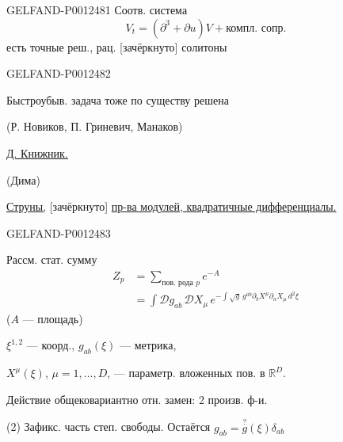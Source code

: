 \begin{GelfandAdjacentEvidence}{GELFAND-P001248}{1}
Соотв. система
\begin{equation*}
V_t=(\partial^3+\partial u)V+\text{компл. сопр.}\tag{23}
\end{equation*}
есть точные реш., рац. [зачёркнуто] солитоны
\end{GelfandAdjacentEvidence}
\begin{GelfandAdjacentEvidence}{GELFAND-P001248}{2}


Быстроубыв. задача тоже по существу решена

(Р. Новиков, П. Гриневич, Манаков)

\underline{\underline{Д. Книжник.}}

(Дима)

\underline{Струны,} [зачёркнуто] \underline{пр-ва модулей, квадратичные дифференциалы.}
\end{GelfandAdjacentEvidence}
\begin{GelfandAdjacentEvidence}{GELFAND-P001248}{3}


Рассм. стат. сумму
\begin{equation*}
\begin{aligned}
Z_p&=\sum_{\text{пов. рода }p}e^{-A}\\
&=\int\mathcal Dg_{ab}\,\mathcal DX_\mu\,
 e^{-\int\sqrt g\,g^{ab}\partial_bX^\mu\partial_aX_\mu\,d^2\xi}
\end{aligned}\tag{1}
\end{equation*}
($A$ — площадь)

$\xi^{1,2}$ — коорд., $g_{ab}(\xi)$ — метрика,

$X^\mu(\xi)$, $\mu=1,\ldots,D$, — параметр. вложенных пов. в $\mathbb R^D$.

Действие общековариантно отн. замен: 2 произв. ф-и.

(2) Зафикс. часть степ. свободы. Остаётся $g_{ab}=\overset{?}{g}(\xi)\delta_{ab}$
\end{GelfandAdjacentEvidence}
